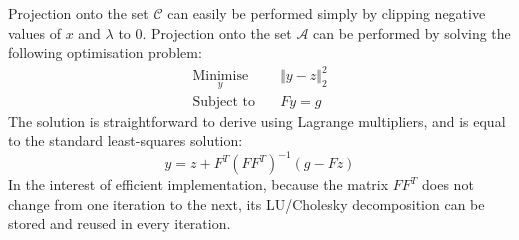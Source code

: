 Projection onto the set $\mathcal{C}$ can easily be performed simply by clipping negative values of $x$ and $\lambda$ to $0$. Projection onto the set $\mathcal{A}$ can be performed by solving the following optimisation problem:
\begin{align*}
    \underset{y}{\text{Minimise}} \quad & \Vert y - z \Vert_2^2 \\
    \text{Subject to} \quad & Fy = g
\end{align*}
The solution is straightforward to derive using Lagrange multipliers, and is equal to the standard least-squares solution:
\begin{equation*}
    y = z + F^T\left(FF^T\right)^{-1}(g - Fz)
\end{equation*}
In the interest of efficient implementation, because the matrix $FF^T$ does not change from one iteration to the next, its LU/Cholesky decomposition can be stored and reused in every iteration.
